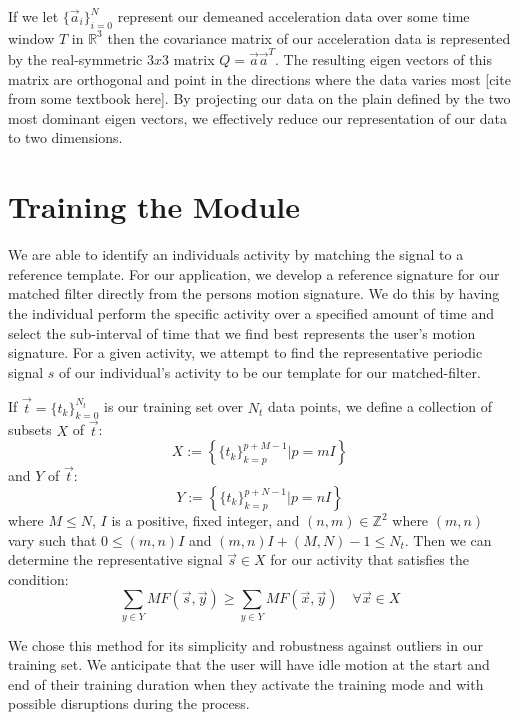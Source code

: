 \documentclass[journal]{IEEEtran}
\begin{document}
If we let $\{\vec{a}_i\}_{i=0}^{N}$ represent our demeaned acceleration data over some time window $T$ in $\mathbb{R}^3$ then the covariance matrix of our acceleration data is represented by the real-symmetric $3x3$ matrix $Q = \vec{a} \vec{a}^T$.
The resulting eigen vectors of this matrix are orthogonal and point in the directions where the data varies most [cite from some textbook here].
By projecting our data on the plain defined by the two most dominant eigen vectors, we effectively reduce our representation of our data to two dimensions.
%
\section{Training the Module}
We are able to identify an individual\textquotesingle s activity by matching the signal to a reference template.
For our application, we develop a reference signature for our matched filter directly from the person\textquotesingle s motion signature.
We do this by having the individual perform the specific activity over a specified amount of time and select the sub-interval of time that we find best represents the user's motion signature.
For a given activity, we attempt to find the representative periodic signal $s$ of our individual’s activity to be our template for our matched-filter.

If $\vec{t} = \{t_k\}_{k=0}^{N_t}$ is our training set over $N_t$ data points, we define a collection of subsets $X$ of $\vec{t}$:
%
\begin{equation} \label{X_subsets_of_training_eq}
X := \left \{ \{t_k\}_{k=p}^{p+M-1} | p=mI \right \}
\end{equation}
%
and $Y$ of $\vec{t}$:
%
\begin{equation} \label{Y_subsets_of_training_eq}
Y := \left \{ \{t_k\}_{k=p}^{p+N-1} | p=nI \right \}
\end{equation}
%
where $M \leq N$, $I$ is a positive, fixed integer, and $(n,m) \in \mathbb{Z}^2$ where $(m,n)$ vary such that $0 \leq (m,n)I$ and $(m,n)I + (M,N) - 1 \leq N_t$. Then we can determine the representative signal $\vec{s} \in X$ for our activity that satisfies the condition:
%
\begin{equation} \label{s_condition}
\sum_{y \in Y}MF(\vec{s}, \vec{y}) \geq \sum_{y \in Y}MF(\vec{x},\vec{y}) \quad \forall \vec{x} \in X
\end{equation}

We chose this method for its simplicity and robustness against outliers in our training set. We anticipate that the user will have idle motion at the start and end of their training duration when they activate the training mode and with possible disruptions during the process.
%
\end{document}
